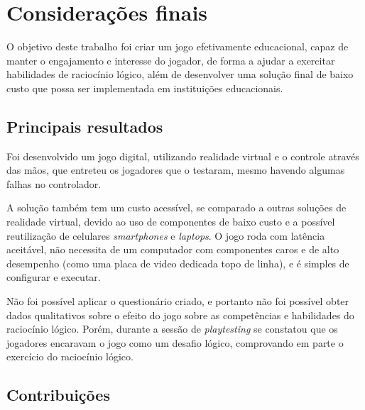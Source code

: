 
\chapter{Considerações finais}\label{cap-consideracoes-finais}

O objetivo deste trabalho foi criar um jogo efetivamente educacional, capaz de manter o engajamento e interesse do jogador, de forma a ajudar a exercitar habilidades de raciocínio lógico, além de desenvolver uma solução final de baixo custo que possa ser implementada em instituições educacionais.

\section{Principais resultados}\label{sec-conc-resultados}

Foi desenvolvido um jogo digital, utilizando realidade virtual e o controle através das mãos, que entreteu os jogadores que o testaram, mesmo havendo algumas falhas no controlador. 

A solução também tem um custo acessível, se comparado a outras soluções de realidade virtual, devido ao uso de componentes de baixo custo e a possível reutilização de celulares \textit{smartphones} e \textit{laptops}. O jogo roda com latência aceitável, não necessita de um computador com componentes caros e de alto desempenho (como uma placa de video dedicada topo de linha), e é simples de configurar e executar.

Não foi possível aplicar o questionário criado, e portanto não foi possível obter dados qualitativos sobre o efeito do jogo sobre as competências e habilidades do raciocínio lógico. Porém, durante a sessão de \textit{playtesting} se constatou que os jogadores encaravam o jogo como um desafio lógico, comprovando em parte o exercício do raciocínio lógico.

\section{Contribuições}\label{sec-conc-contribuicoes}

